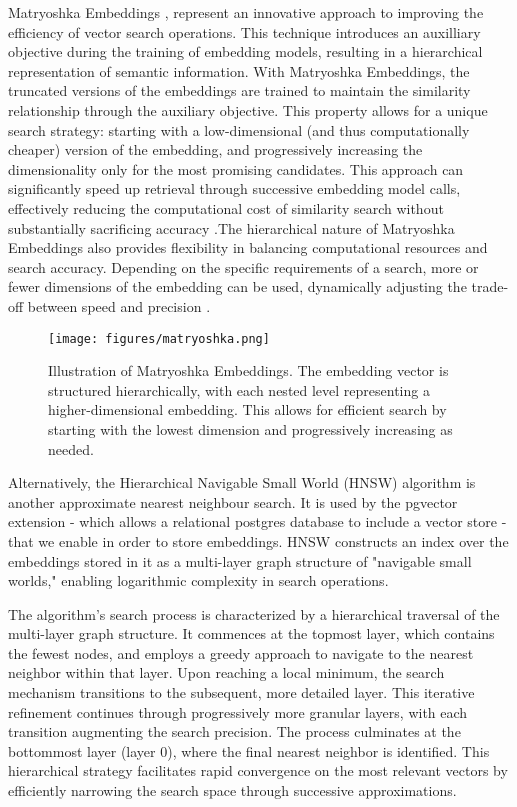 \documentclass[a4paper, oneside]{discothesis}
\begin{document}
Matryoshka Embeddings \cite{kusupati2024matryoshkarepresentationlearning}, represent an innovative approach to improving the efficiency of vector search operations. This technique introduces an auxilliary objective during the training of embedding models, resulting in a hierarchical representation of semantic information. With Matryoshka Embeddings, the truncated versions of the embeddings are trained to maintain the similarity relationship through the auxiliary objective. This property allows for a unique search strategy: starting with a low-dimensional (and thus computationally cheaper) version of the embedding, and progressively increasing the dimensionality only for the most promising candidates. This approach can significantly speed up retrieval through successive embedding model calls, effectively reducing the computational cost of similarity search without substantially sacrificing accuracy \cite{kusupati2024matryoshkarepresentationlearning}.The hierarchical nature of Matryoshka Embeddings also provides flexibility in balancing computational resources and search accuracy. Depending on the specific requirements of a search, more or fewer dimensions of the embedding can be used, dynamically adjusting the trade-off between speed and precision \cite{kusupati2024matryoshkarepresentationlearning}.

\begin{figure}[h]
\centering
\texttt{[image: figures/matryoshka.png]}
\caption{Illustration of Matryoshka Embeddings. The embedding vector is structured hierarchically, with each nested level representing a higher-dimensional embedding. This allows for efficient search by starting with the lowest dimension and progressively increasing as needed.}
\label{fig:matryoshka_embeddings}
\end{figure}

Alternatively, the Hierarchical Navigable Small World (HNSW) algorithm \cite{malkov2018efficient} is another approximate nearest neighbour search. It is used by the pgvector extension - which allows a relational postgres database to include a vector store - that we enable in order to store embeddings. HNSW constructs an index over the embeddings stored in it as a multi-layer graph structure of "navigable small worlds," enabling logarithmic complexity in search operations.

The algorithm's search process is characterized by a hierarchical traversal of the multi-layer graph structure. It commences at the topmost layer, which contains the fewest nodes, and employs a greedy approach to navigate to the nearest neighbor within that layer. Upon reaching a local minimum, the search mechanism transitions to the subsequent, more detailed layer. This iterative refinement continues through progressively more granular layers, with each transition augmenting the search precision. The process culminates at the bottommost layer (layer 0), where the final nearest neighbor is identified. This hierarchical strategy facilitates rapid convergence on the most relevant vectors by efficiently narrowing the search space through successive approximations.
\end{document}
